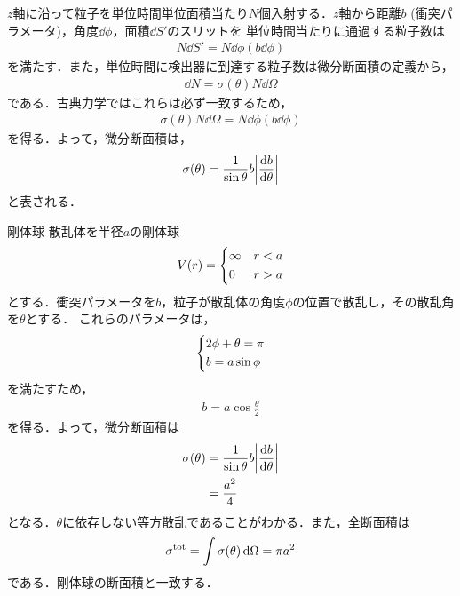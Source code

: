 \documentclass{report}
\begin{document}
  $z$軸に沿って粒子を単位時間単位面積当たり$N$個入射する．$z$軸から距離$b$ (衝突パラメータ)，角度$\dd{\phi}$，面積$\dd{S'}$のスリットを
  単位時間当たりに通過する粒子数は
  \begin{align}
    N\dd{S'} = N \dd{\phi} (b \dd{\phi})
  \end{align}
  を満たす．また，単位時間に検出器に到達する粒子数は微分断面積の定義から，
  \begin{align}
    \dd{N} = \sigma (\theta) N \dd{\Omega}
  \end{align}
  である．古典力学ではこれらは必ず一致するため，
  \begin{align}
    \sigma (\theta) N \dd{\Omega} = N \dd{\phi} (b \dd{\phi})
  \end{align}
  を得る．よって，微分断面積は，
  \begin{align}
    \sigma(\theta) = \frac{1}{\sin \theta} b \abs{\frac{\dd{b}}{\dd{\theta}}}
  \end{align}
  と表される．
  \begin{myex}{剛体球}{}
    散乱体を半径$a$の剛体球
    \begin{align}
      V(r) = 
      \begin{dcases}
        \infty & r < a \\
        0 & r > a
      \end{dcases}
    \end{align}
    とする．衝突パラメータを$b$，粒子が散乱体の角度$\phi$の位置で散乱し，その散乱角を$\theta$とする．
    これらのパラメータは，
    \begin{align}
      \begin{dcases}
        2\phi + \theta = \pi\\
        b = a\sin \phi
      \end{dcases}
    \end{align}
    を満たすため，
    \begin{align}
      b = a\cos \frac{\theta}{2}
    \end{align}
    を得る．よって，微分断面積は
    \begin{align}
    \sigma(\theta) &= \frac{1}{\sin \theta} b \abs{\frac{\dd{b}}{\dd{\theta}}}\\
    &= \frac{a^2}{4}
    \end{align}
    となる．$\theta$に依存しない等方散乱であることがわかる．また，全断面積は
    \begin{align}
      \sigma^{\mathrm{tot}} = \int \sigma(\theta) \dd{\Omega} = \pi a^2
    \end{align}
    である．剛体球の断面積と一致する．
  \end{myex}
\end{document}
